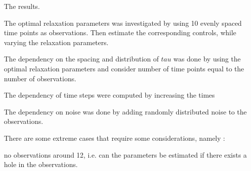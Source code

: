 \documentclass[11pt,a4paper]{article}
\begin{document}
The results.

The optimal relaxation parameters was investigated by using 10 evenly spaced time points as observations. Then estimate the corresponding controls, while varying the relaxation parameters.


The dependency on the spacing and distribution of $tau$ was done by using the optimal relaxation parameters and consider number of time points equal to the number of observations. 


The dependency of time steps were computed by increasing the times



The dependency on noise was done by adding randomly distributed noise to the observations.

There are some extreme cases that require some considerations, namely :

no observations around 12, i.e. can the parameters be estimated if there exists a hole in the observations.
\end{document}
